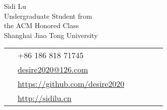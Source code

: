 \documentclass[10pt]{article} %
\begin{document}
\begin{paracol}{2} %


\parbox[top][0.12\textheight][c]{\linewidth}{ %
	\vspace{-0.04\textheight} %
	\centering %
	{\sffamily\Huge Sidi Lu}\\\medskip %
	{\color{headings} Undergraduate Student from}\\
	{\color{headings} the ACM Honored Class}\\
	{\color{headings} Shanghai Jiao Tong University}
}
\parbox[top][0.12\textheight][c]{\linewidth}{ %
	\vspace{-0.04\textheight} %
	\colorbox{shade}{ %
		\begin{supertabular}{p{0.05\linewidth}|p{0.775\linewidth}} %
			\raisebox{-1pt}{\faPhone} & +86 186 818 71745 \\ %
			\raisebox{0pt}{\small\faEnvelope} & \href{mailto:desire2020@126.com}{desire2020@126.com} \\ %
			\raisebox{-1pt}{\small\faGithub} & \href{https://github.com/desire2020}{https://github.com/desire2020} \\ %
			\raisebox{-1pt}{\faHome} & \href{http://sidilu.cn}{http://sidilu.cn} \\ %
		\end{supertabular}
	}
}


\end{paracol}
\end{document}
